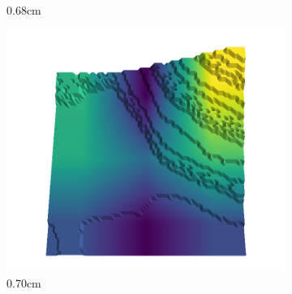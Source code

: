 \begin{figure}[H]
\begin{subfigure}[b]{0.192\linewidth}
    \caption{0.68cm}
    \label{fig : quarry-best-18}
    \end{subfigure}
    \begin{subfigure}[b]{0.192\linewidth}
    \includegraphics[width=\linewidth]{../img/5/quarry/best/70-patch-3d-majavi-colormap-190.png}
    \caption{0.70cm}
    \label{fig : quarry-best-19}
    \end{subfigure}
    \label{fig : quarry-best}
    \caption{}
    \end{figure}

